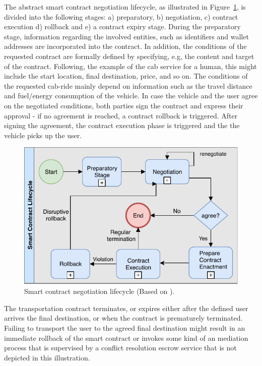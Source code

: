 \documentclass{llncs}
\begin{document}
{			The abstract smart contract negotiation lifecycle, as illustrated in Figure~\ref{fig:smart-contract-lifecycle-management}, is divided into the following stages: a) preparatory, b) negotiation, c) contract execution d) rollback and e) a contract expiry stage. During the preparatory stage, information regarding the involved entities, such as identifiers and wallet addresses are incorporated into the contract. In addition, the conditions of the requested contract are formally defined by specifying, e.g, the content and target of the contract. Following, the example of the cab service for a human, this might include the start location, final destination, price, and so on. The conditions of the requested cab-ride mainly depend on information such as the travel distance and fuel/energy consumption of the vehicle. In case the vehicle and the user agree on the negotiated conditions, both parties sign the contract and express their approval - if no agreement is reached, a contract rollback is triggered. After signing the agreement, the contract execution phase is triggered and the the vehicle picks up the user. 

			\begin{figure}[H]
				\centering
				\includegraphics[scale=0.65]{Figures/smart-contract-lifecycle/20180504_smart-contract-lilfefycle.pdf}
				\caption{Smart contract negotiation lifecycle (Based on \cite{qtumWhitepaper}).}	
				\label{fig:smart-contract-lifecycle-management}
			\end{figure}			

			The transportation contract terminates, or expires either after the defined user arrives the final destination, or when the contract is prematurely terminated. Failing to transport the user to the agreed final destination might result in an immediate rollback of the smart contract or invokes some kind of an mediation process that is supervised by a conflict resolution escrow service that is not depicted in this illustration.
	
}
\end{document}

